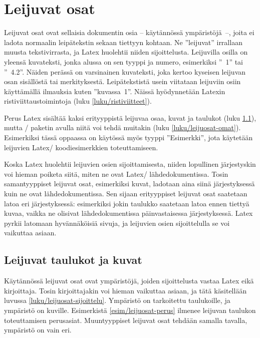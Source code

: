 \section{Leijuvat osat}
\label{luku/leijuosat}

Leijuvat osat ovat sellaisia dokumentin osia -- käytännössä
ympäristöjä~--, joita ei ladota normaalin leipätekstin sekaan tiettyyn
kohtaan. Ne ''leijuvat'' irrallaan muusta tekstivirrasta, ja Latex
huolehtii niiden sijoittelusta. Leijuvilla osilla on yleensä kuvateksti,
jonka alussa on sen tyyppi ja numero, esimerkiksi ''\figurename~1'' tai
''\tablename\ 4.2''. Näiden perässä on varsinainen kuvateksti, joka
kertoo kyseisen leijuvan osan sisällöstä tai merkityksestä.
Leipätekstistä usein viitataan leijuviin osiin käyttämällä ilmauksia
kuten ''kuvassa~1''. Näissä hyödynnetään Latexin ristiviittaustoimintoja
(luku \ref{luku/ristiviitteet}).

Perus Latex sisältää kaksi erityyppistä leijuvaa osaa, kuvat ja taulukot
(luku \ref{luku/leijuosat-latex}), mutta \-/ paketin
avulla niitä voi tehdä muitakin (luku \ref{luku/leijuosat-omat}).
Esimerkiksi tässä oppaassa on käytössä myös tyyppi ''Esimerkki'', jota
käytetään leijuvien Latex\-/ koodiesimerkkien toteuttamiseen.

Koska Latex huolehtii leijuvien osien sijoittamisesta, niiden lopullinen
järjestyskin voi hieman poiketa siitä, miten ne ovat Latex\-/
lähdedokumentissa. Tosin samantyyppiset leijuvat osat, esimerkiksi
kuvat, ladotaan aina siinä järjestyksessä kuin ne ovat
lähdedokumentissa. Sen sijaan erityyppiset leijuvat osat saatetaan latoa
eri järjestyksessä: esimerkiksi jokin taulukko saatetaan latoa ennen
tiettyä kuvaa, vaikka ne olisivat lähdedokumentissa päinvastaisessa
järjestyksessä. Latex pyrkii latomaan hyvännäköisiä sivuja, ja leijuvien
osien sijoittelulla se voi vaikuttaa asiaan.

\subsection{Leijuvat taulukot ja kuvat}
\label{luku/leijuosat-latex}

Käytännössä leijuvat osat ovat ympäristöjä, joiden sijoittelusta vastaa
Latex eikä kirjoittaja. Tosin kirjoittajakin voi hieman vaikuttaa
asiaan, ja tätä käsitellään luvussa \ref{luku/leijuosat-sijoittelu}.
Ympäristö  on tarkoitettu taulukoille, ja ympäristö
 on kuville. Esimerkistä \ref{esim/leijuosat-perus}
ilmenee leijuvan taulukon toteuttamisen perusasiat. Muuntyyppiset
leijuvat osat tehdään samalla tavalla, ympäristö on vain eri.

